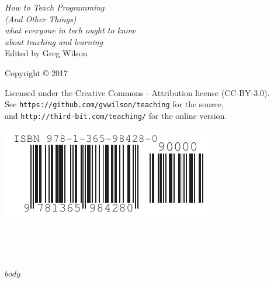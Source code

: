 \documentclass[10pt,statementpaper]{memoir}
\begin{document}
\pagestyle{empty}

{\begingroup
  \raggedleft
  \vspace*{\baselineskip}

  {\Huge\itshape How to Teach Programming \\ (And Other Things)}\\[\baselineskip]

  {\large\itshape
    what everyone in tech ought to know\\ about teaching and learning
  }\\[0.2\textheight]

  {\large Edited by Greg Wilson}\par

  \vfill

  {\large Copyright {\copyright} 2017}

  \vspace*{\baselineskip}

  {\small
    Licensed under the Creative Commons - Attribution license (CC-BY-3.0).
    \\
    See \texttt{https://github.com/gvwilson/teaching} for the source,\\
    and \texttt{http://third-bit.com/teaching/} for the online version.
  }

  \vspace*{4\baselineskip}

  \includegraphics{isbn-barcode.pdf}

\endgroup}

\newpage

\pagestyle{empty}

~

\newpage

\tableofcontents

\newpage

\pagestyle{empty}

~

\newpage

\pagestyle{plain}

$body$
\end{document}
